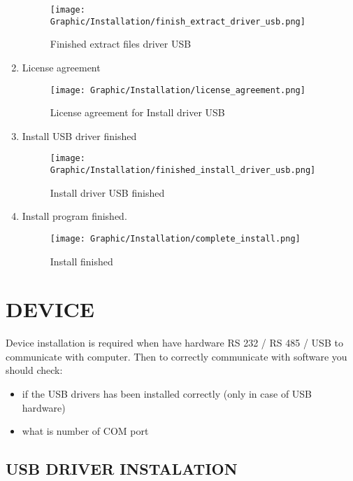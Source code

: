 \begin{enumerate}
	\begin{figure}[!h] 
	\centering \texttt{[image: Graphic/Installation/finish\_extract\_driver\_usb.png]}	
	\caption{Finished extract files driver USB}
	\label{install_in_progress}
	\end{figure}
	\FloatBarrier

	\newpage
	\item License agreement \\
	\begin{figure}[!h] 
	\centering \texttt{[image: Graphic/Installation/license\_agreement.png]}	
	\caption{License agreement for Install  driver USB}
	\label{install_in_progress}
	\end{figure}
	\FloatBarrier

\item Install USB driver finished \\
	\begin{figure}[!h] 
	\centering \texttt{[image: Graphic/Installation/finished\_install\_driver\_usb.png]}	
	\caption{Install  driver USB finished}
	\label{install_in_progress}
	\end{figure}
	\FloatBarrier

\newpage
	\item Install program finished. \\
	\begin{figure}[!h] 
	\centering \texttt{[image: Graphic/Installation/complete\_install.png]}	
	\caption{Install finished}
	\label{install_finished}
	\end{figure}
	\FloatBarrier

\end{enumerate}
\newpage
\section{DEVICE}

Device installation is required when  \deviceName have hardware RS 232 / RS 485 / USB to communicate with computer.  Then to correctly communicate  \deviceName with software you should check:
\begin{itemize}
	\item if the USB drivers has been installed correctly (only in  case of USB hardware)
	\item what is number of COM port
\end{itemize}

\subsection{USB DRIVER INSTALATION} \label{usb_driver_installation}

